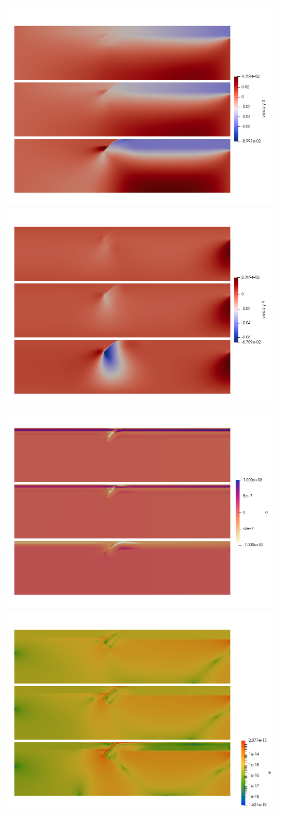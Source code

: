 \begin{center}
\includegraphics[width=7cm]{python_codes/fieldstone_67/images/u_123}
\includegraphics[width=7cm]{python_codes/fieldstone_67/images/v_123}\\
\includegraphics[width=7cm]{python_codes/fieldstone_67/images/q_123}
\includegraphics[width=7cm]{python_codes/fieldstone_67/images/e_123}\\

\end{center}
